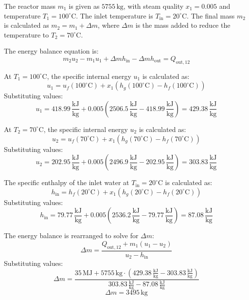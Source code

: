 The reactor mass \( m_1 \) is given as \( 5755 \, \text{kg} \), with steam quality \( x_1 = 0.005 \) and temperature \( T_1 = 100^\circ\text{C} \). The inlet temperature is \( T_{\text{in}} = 20^\circ\text{C} \). The final mass \( m_2 \) is calculated as \( m_2 = m_1 + \Delta m \), where \( \Delta m \) is the mass added to reduce the temperature to \( T_2 = 70^\circ\text{C} \).

The energy balance equation is:  
\[
m_2 u_2 - m_1 u_1 + \Delta m h_{\text{in}} - \Delta m h_{\text{out}} = Q_{\text{out},12}
\]

At \( T_1 = 100^\circ\text{C} \), the specific internal energy \( u_1 \) is calculated as:  
\[
u_1 = u_f(100^\circ\text{C}) + x_1 \left( h_g(100^\circ\text{C}) - h_f(100^\circ\text{C}) \right)
\]  
Substituting values:  
\[
u_1 = 418.99 \, \frac{\text{kJ}}{\text{kg}} + 0.005 \left( 2506.5 \, \frac{\text{kJ}}{\text{kg}} - 418.99 \, \frac{\text{kJ}}{\text{kg}} \right) = 429.38 \, \frac{\text{kJ}}{\text{kg}}
\]

At \( T_2 = 70^\circ\text{C} \), the specific internal energy \( u_2 \) is calculated as:  
\[
u_2 = u_f(70^\circ\text{C}) + x_1 \left( h_g(70^\circ\text{C}) - h_f(70^\circ\text{C}) \right)
\]  
Substituting values:  
\[
u_2 = 202.95 \, \frac{\text{kJ}}{\text{kg}} + 0.005 \left( 2496.9 \, \frac{\text{kJ}}{\text{kg}} - 202.95 \, \frac{\text{kJ}}{\text{kg}} \right) = 303.83 \, \frac{\text{kJ}}{\text{kg}}
\]

The specific enthalpy of the inlet water at \( T_{\text{in}} = 20^\circ\text{C} \) is calculated as:  
\[
h_{\text{in}} = h_f(20^\circ\text{C}) + x_1 \left( h_g(20^\circ\text{C}) - h_f(20^\circ\text{C}) \right)
\]  
Substituting values:  
\[
h_{\text{in}} = 79.77 \, \frac{\text{kJ}}{\text{kg}} + 0.005 \left( 2536.2 \, \frac{\text{kJ}}{\text{kg}} - 79.77 \, \frac{\text{kJ}}{\text{kg}} \right) = 87.08 \, \frac{\text{kJ}}{\text{kg}}
\]

The energy balance is rearranged to solve for \( \Delta m \):  
\[
\Delta m = \frac{Q_{\text{out},12} + m_1 (u_1 - u_2)}{u_2 - h_{\text{in}}}
\]  
Substituting values:  
\[
\Delta m = \frac{35 \, \text{MJ} + 5755 \, \text{kg} \cdot (429.38 \, \frac{\text{kJ}}{\text{kg}} - 303.83 \, \frac{\text{kJ}}{\text{kg}})}{303.83 \, \frac{\text{kJ}}{\text{kg}} - 87.08 \, \frac{\text{kJ}}{\text{kg}}}
\]  
\[
\Delta m = 3495 \, \text{kg}
\]